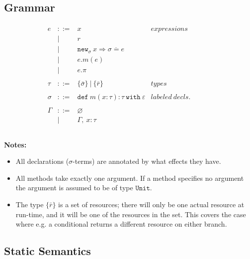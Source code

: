 \documentclass{llncs}
\newcommand{\keywadj}[1]{\mathtt{#1}}
\newcommand{\keyw}[1]{\keywadj{#1}~}
\newcommand{\newsig}[0]{
	\keywadj{new}_\sigma~x \Rightarrow \overline{\sigma = e}
}
\begin{document}
\subsection{Grammar}

\[
\begin{array}{lll}
\begin{array}{lllr}

	e & ::= & x & expressions \\
  		& | & r \\
  		& | & \newsig \\
  		& | & e.m(e)\\
  		& | & e.\pi\\
		&&\\

	\tau & ::= & \{ \bar \sigma \} ~ | ~ \{ \bar r \} & types \\
		&&\\

	\sigma & ::= &  \keyw{def} m(x:\tau):\tau~\keyw{with}\varepsilon  & labeled~ decls.\\
		&&\\
		
	\Gamma & ::= & \varnothing \\
		& | & \Gamma,~x : \tau\\
		&&\\

\end{array}
& ~~~~~~
&
\end{array}
\]


\noindent \textbf{Notes:}

\begin{itemize}
	\item All declarations ($\sigma$-terms) are annotated by what effects they have.
	\item All methods take exactly one argument. If a method specifies no argument the argument is assumed to be of type $\keywadj{Unit}$.
	\item The type $\{ \bar r \}$ is a set of resources; there will only be one actual resource at run-time, and it will be one of the resources in the set. This covers the case where e.g. a conditional returns a different resource on either branch.
\end{itemize}

\subsection{Static Semantics}
\noindent
\fbox{$\Gamma \vdash e : \tau~\keyw{with} \varepsilon$}
\end{document}
